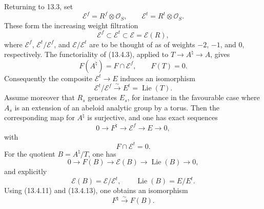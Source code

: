 \documentclass[11pt]{article}
\providecommand{\Lie}{\operatorname{Lie}}
\providecommand{\cO}{\mathcal O}
\providecommand{\cE}{\mathcal E}
\begin{document}
Returning to 13.3, set
\begin{equation}\tag{13.4.7}
        \cE^f=R^f\otimes\cO_S,
        \qquad
        \cE^t=R^t\otimes\cO_S.
\end{equation}
These form the increasing weight filtration
\begin{equation}\tag{13.4.8}
        \cE^f\subset\cE^t\subset\cE=\cE(R),
\end{equation}
where \(\cE^f\), \(\cE^t/\cE^f\), and \(\cE/\cE^t\) are to be thought of as of weights \(-2\), \(-1\), and \(0\), respectively.  The functoriality of (13.4.3), applied to \(T\to A^\natural\to A\), gives
\begin{equation}\tag{13.4.10}
        F(A^\natural)=F\cap \cE^f,
        \qquad
        F(T)=0.
\end{equation}
Consequently the composite \(\cE^t\to E\) induces an isomorphism
\begin{equation}\tag{13.4.11}
        \cE^t/\cE^f\xrightarrow{\sim}E^t=\Lie(T).
\end{equation}
Assume moreover that \(R_s\) generates \(E_s\), for instance in the favourable case where \(A_s\) is an extension of an abeloid analytic group by a torus.  Then the corresponding map for \(A^\natural\) is surjective, and one has exact sequences
\begin{equation}\tag{13.4.12}
        0\longrightarrow F^\natural\longrightarrow \cE^f\longrightarrow E\longrightarrow0,
\end{equation}
with
\begin{equation}\tag{13.4.13}
        F\cap \cE^t=0.
\end{equation}
For the quotient \(B=A^\natural/T\), one has
\begin{equation}\tag{13.4.14}
        0\longrightarrow F(B)\longrightarrow \cE(B)\longrightarrow \Lie(B)\longrightarrow0,
\end{equation}
and explicitly
\begin{equation}\tag{13.4.15}
        \cE(B)=\cE/\cE^t,
        \qquad
        \Lie(B)=E/E^t.
\end{equation}
Using (13.4.11) and (13.4.13), one obtains an isomorphism
\begin{equation}\tag{13.4.16}
        F^\natural\xrightarrow{\sim}F(B).
\end{equation}
\end{document}

